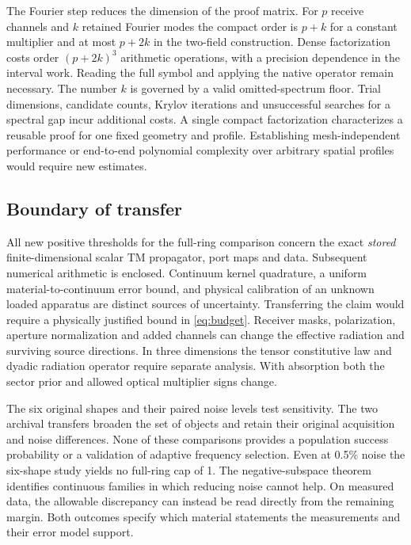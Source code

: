 \documentclass[anonymous,12pt]{iopjournal}
\theoremstyle{remark}\newtheorem{remark}[theorem]{Remark}
\numberwithin{equation}{section}
\begin{document}
The Fourier step reduces the dimension of the proof matrix. For $p$ receive channels and $k$ retained Fourier modes the compact order is $p+k$ for a constant multiplier and at most $p+2k$ in the two-field construction. Dense factorization costs order $(p+2k)^3$ arithmetic operations, with a precision dependence in the interval work. Reading the full symbol and applying the native operator remain necessary. The number $k$ is governed by a valid omitted-spectrum floor. Trial dimensions, candidate counts, Krylov iterations and unsuccessful searches for a spectral gap incur additional costs. A single compact factorization characterizes a reusable proof for one fixed geometry and profile. Establishing mesh-independent performance or end-to-end polynomial complexity over arbitrary spatial profiles would require new estimates.

\subsection{Boundary of transfer}
All new positive thresholds for the full-ring comparison concern the exact \emph{stored} finite-dimensional scalar TM propagator, port maps and data. Subsequent numerical arithmetic is enclosed. Continuum kernel quadrature, a uniform material-to-continuum error bound, and physical calibration of an unknown loaded apparatus are distinct sources of uncertainty. Transferring the claim would require a physically justified bound in \eqref{eq:budget}. Receiver masks, polarization, aperture normalization and added channels can change the effective radiation and surviving source directions. In three dimensions the tensor constitutive law and dyadic radiation operator require separate analysis. With absorption both the sector prior and allowed optical multiplier signs change.

The six original shapes and their paired noise levels test sensitivity. The two archival transfers broaden the set of objects and retain their original acquisition and noise differences. None of these comparisons provides a population success probability or a validation of adaptive frequency selection. Even at 0.5\% noise the six-shape study yields no full-ring cap of 1. The negative-subspace theorem identifies continuous families in which reducing noise cannot help. On measured data, the allowable discrepancy can instead be read directly from the remaining margin. Both outcomes specify which material statements the measurements and their error model support.
\end{document}
